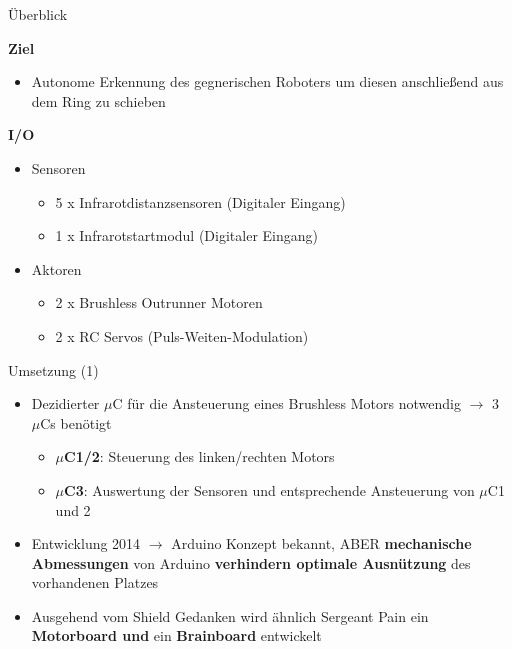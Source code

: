 \documentclass{beamer}
\begin{document}
\begin{frame}{\"Uberblick}
\begin{large}\textbf{Ziel}\end{large}
\begin{itemize}
	\item Autonome Erkennung des gegnerischen Roboters um diesen anschlie\ss{}end aus dem Ring zu schieben
\end{itemize}
\vspace{20px}
\begin{large}\textbf{I/O}\end{large}
\begin{itemize}
	\item Sensoren
	\begin{itemize}
		\item 5 x Infrarotdistanzsensoren (Digitaler Eingang)
		\item 1 x Infrarotstartmodul (Digitaler Eingang)
	\end{itemize}
	\item Aktoren
	\begin{itemize}
		\item 2 x Brushless Outrunner Motoren
		\item 2 x RC Servos (Puls-Weiten-Modulation)
	\end{itemize}
\end{itemize}
\end{frame}
\begin{frame}{Umsetzung (1)}
\begin{itemize}
	\item Dezidierter $\mu$C f\"ur die Ansteuerung eines Brushless Motors notwendig $\rightarrow$ 3 $\mu$Cs ben\"otigt
	\begin{itemize}
		\item \textbf{$\mu$C1/2}: Steuerung des linken/rechten Motors
		\item \textbf{$\mu$C3}: Auswertung der Sensoren und entsprechende Ansteuerung von $\mu$C1 und 2
	\end{itemize}
\end{itemize}
\begin{itemize}
	\item Entwicklung 2014 $\rightarrow$ Arduino Konzept bekannt, ABER \textbf{mechanische Abmessungen} von Arduino \textbf{verhindern optimale Ausn\"utzung} des vorhandenen Platzes
\end{itemize}
\begin{itemize}
	\item Ausgehend vom Shield Gedanken wird \"ahnlich Sergeant Pain ein \textbf{Motorboard und} ein \textbf{Brainboard} entwickelt
\end{itemize}
\end{frame}
\end{document}
